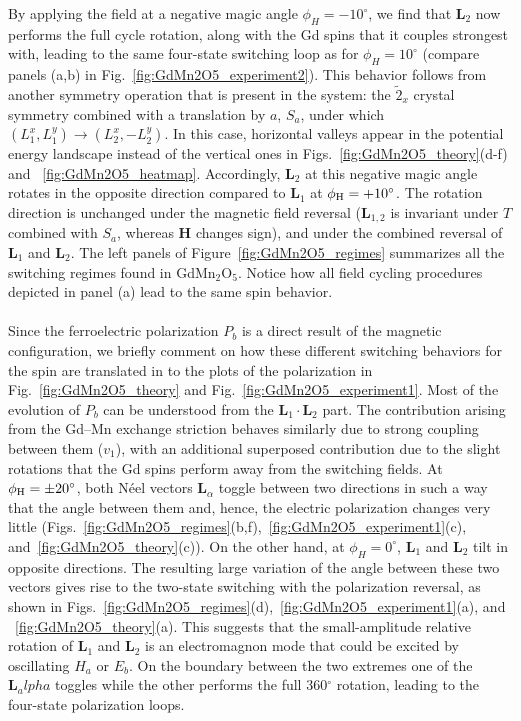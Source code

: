 By applying the field at a negative magic angle $\phi_H = -10^\circ$, we find that $\bm L_2$ now performs the full cycle rotation, along with the Gd spins that it couples strongest with, leading to the same four-state switching loop as for $\phi_H = 10^\circ$ (compare panels (a,b) in Fig.~\ref{fig:GdMn2O5_experiment2}).
This behavior follows from another symmetry operation that is present in the system: the $\tilde{2}_x$ crystal symmetry combined with a translation by $a$, $S_a$, under which $(L_1^x,L_1^y) \rightarrow (L_2^x,-L_2^y)$.
In this case, horizontal valleys appear in the potential energy landscape instead of the vertical ones in Figs.~\ref{fig:GdMn2O5_theory}(d-f) and ~\ref{fig:GdMn2O5_heatmap}.
Accordingly, $\bm{L}_2$ at this negative magic angle rotates in the opposite direction compared to  $\bm{L}_1$ at $\phi_{\rm H} = +10^\circ$.
The rotation direction is unchanged under the magnetic field reversal ($\bm{L}_{1,2}$ is invariant under $T$ combined with $S_a$, whereas $\bm{H}$ changes sign), and under the combined reversal of $\bm{L}_{1}$ and $\bm{L}_{2}$.
The left panels of Figure~\ref{fig:GdMn2O5_regimes} summarizes all the switching regimes found in GdMn$_2$O$_5$.
Notice how all field cycling procedures depicted in panel (a) lead to the same spin behavior.
\\\\
%
Since the ferroelectric polarization $P_b$ is a direct result of the magnetic configuration, we briefly comment on how these different switching behaviors for the spin are translated in to the plots of the polarization in Fig.~\ref{fig:GdMn2O5_theory} and Fig.~\ref{fig:GdMn2O5_experiment1}.
Most of the evolution of $P_b$ can be understood from the $\bm L_1 \cdot \bm L_2$ part. The contribution arising from the Gd--Mn exchange striction behaves similarly due to strong coupling between them ($v_1$), with an additional superposed contribution due to the slight rotations that the Gd spins perform away from the switching fields.
At $\phi_{\rm H} = \pm 20^\circ$, both N\'eel vectors $\bm L_\alpha$ toggle between two directions in such a way that the angle between them and, hence, the electric polarization changes very little (Figs.~\ref{fig:GdMn2O5_regimes}(b,f),~\ref{fig:GdMn2O5_experiment1}(c), and~\ref{fig:GdMn2O5_theory}(c)). 
On the other hand, at $\phi_{H}=0^\circ$, $\bm{L}_1$ and  $\bm{L}_2$ tilt in opposite directions. The resulting large variation of the angle between these two vectors gives rise to the two-state switching with the polarization reversal, as shown in Figs.~\ref{fig:GdMn2O5_regimes}(d),~\ref{fig:GdMn2O5_experiment1}(a), and ~\ref{fig:GdMn2O5_theory}(a). This suggests that the small-amplitude relative rotation of $\bm{L}_1$ and $\bm{L}_2$ is an electromagnon mode that could be excited by oscillating $H_a$ or $E_b$.
On the boundary between the two extremes one of the $\bm L_alpha$ toggles while the other performs the full 360$^\circ$ rotation, leading to the four-state polarization loops.
%
%
